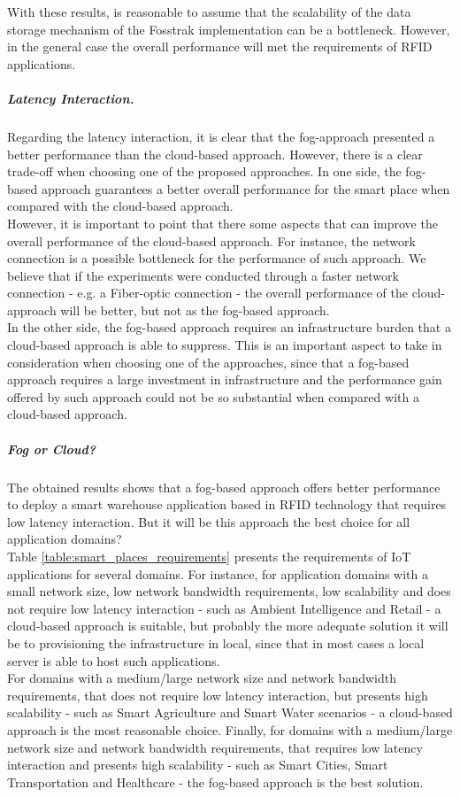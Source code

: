 With these results, is reasonable to assume that the scalability of the data storage mechanism of
the Fosstrak implementation can be a bottleneck. However, in the general case the overall
performance will met the requirements of \gls{RFID} applications.

\subparagraph{Latency Interaction.}
\label{subp:eval_results_latency}
Regarding the latency interaction, it is clear that the fog-approach presented a better performance
than the cloud-based approach. However, there is a clear trade-off when choosing one of the proposed
approaches. In one side, the fog-based approach guarantees a better overall performance for the smart
place when compared with the cloud-based approach.\\

However, it is important to point that there some aspects that can improve the overall performance
of the cloud-based approach. For instance, the network connection is a possible bottleneck for the
performance of such approach. We believe that if the experiments were conducted through a faster
network connection - e.g. a Fiber-optic connection - the overall performance of the cloud-approach
will be better, but not as the fog-based approach.\\

In the other side, the fog-based approach requires an infrastructure burden that a cloud-based approach
is able to suppress. This is an important aspect to take in consideration when choosing one of the
approaches, since that a fog-based approach requires a large investment in infrastructure and the
performance gain offered by such approach could not be so substantial when compared with a cloud-based
approach.\\

\subparagraph{Fog or Cloud?}
\label{subp:eval_conclusion}
The obtained results shows that a fog-based approach offers better performance to deploy a smart
warehouse application based in \gls{RFID} technology that requires low latency interaction.
But it will be this approach the best choice for all application domains?\\

Table \ref{table:smart_places_requirements} presents the requirements of \gls{IoT} applications
for several domains. For instance, for application domains with a small network size, low network
bandwidth requirements, low scalability and does not require low latency interaction - such as Ambient
Intelligence and Retail - a cloud-based approach is suitable, but probably the more adequate
solution it will be to provisioning the infrastructure in local, since that in most cases a local
server is able to host such applications.\\

For domains with a medium/large network size and network bandwidth requirements, that does not require
low latency interaction, but presents high scalability - such as Smart Agriculture and Smart Water
scenarios - a cloud-based approach is the most reasonable choice. Finally, for domains with a
medium/large network size and network bandwidth requirements, that requires low latency interaction
and presents high scalability - such as Smart Cities, Smart Transportation and Healthcare - the
fog-based approach is the best solution.
